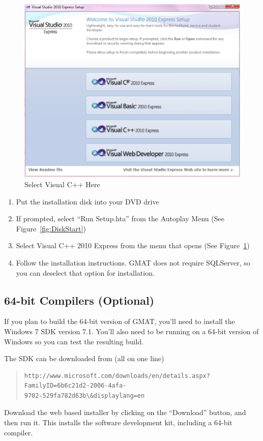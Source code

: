 \documentclass[letterpaper,10pt]{article}%
\begin{document}
\begin{figure}
	\centering
		\includegraphics[scale=0.5]{VisualCpp.eps}
	\caption{Select Visual C++ Here}
	\label{fig:VisualCpp}
\end{figure}

\begin{enumerate}
\item Put the installation disk into your DVD drive
\item If prompted, select ``Run Setup.hta'' from the Autoplay Menu (See Figure~\ref{fig:DiskStart})
\item Select Visual C++ 2010 Express from the menu that opens (See Figure~\ref{fig:VisualCpp})
\item Follow the installation instructions.  GMAT does not require SQLServer, so you can deselect that option for installation.
\end{enumerate}

\subsection{64-bit Compilers (Optional)}

If you plan to build the 64-bit version of GMAT, you'll need to install the Windows 7 SDK version 7.1.  You'll also need to be running on a 64-bit version of Windows so you can test the resulting build.

The SDK can be downloaded from (all on one line)
\begin{quote}
\begin{verbatim}
http://www.microsoft.com/downloads/en/details.aspx?FamilyID=6b6c21d2-2006-4afa-
9702-529fa782d63b\&displaylang=en
\end{verbatim}
\end{quote}
\noindent Download the web based installer by clicking on the ``Download'' button, and then run it.  This installs the software development kit, including a 64-bit compiler.
\end{document}
